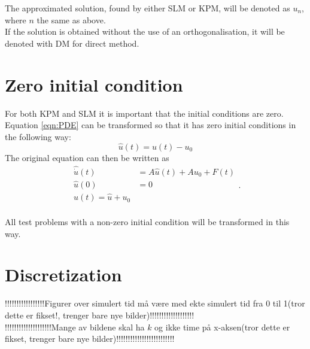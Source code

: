 The approximated solution, found by either SLM or KPM, will be denoted as $u_n$, where $n$ the same as above. \\

If the solution is obtained without the use of an orthogonalisation, it will be denoted with DM for direct method.


\section{Zero initial condition}
For both KPM and SLM it is important that the initial conditions are zero. Equation \eqref{eqn:PDE} can be transformed so that it has zero initial conditions in the following way:
\begin{equation*}
\hat{u}(t) = u(t)-u_0
\end{equation*}
The original equation can then be written as
\begin{equation}
\begin{aligned}
\hat{\dot{u}}(t) &= A \hat{u}(t) +A u_0 + F(t) \\
 \hat{u}(0)&= 0 \\
 u(t) = \hat{u} + u_0 \\
\end{aligned}.
\end{equation}

All test problems with a non-zero initial condition will be transformed in this way.

\section{Discretization}
!!!!!!!!!!!!!!!!!Figurer over simulert tid må være med ekte simulert tid fra 0 til 1(tror dette er fikset!, trenger bare nye bilder)!!!!!!!!!!!!!!!!!!!\\
!!!!!!!!!!!!!!!!!!!!Mange av bildene skal ha $k$ og ikke time på x-aksen(tror dette er fikset, trenger bare nye bilder)!!!!!!!!!!!!!!!!!!!!!!!!!\\

